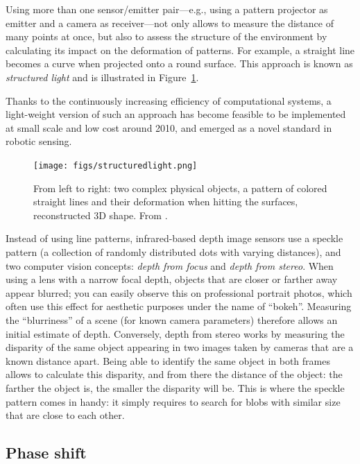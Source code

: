 Using more than one  sensor/emitter pair---e.g., using a pattern projector as emitter and a camera as receiver---not only allows to measure the distance of many points at once, but also to assess the structure of the environment by calculating its impact on the deformation of patterns. For example, a straight line becomes a curve when projected onto a round surface. This approach is known as \textsl{structured light} and is illustrated in Figure~\ref{fig:struclight}.

Thanks to the continuously increasing efficiency of computational systems, a light-weight version of such an approach has become feasible to be implemented at small scale and low cost around 2010, and emerged as a novel standard in robotic sensing.

\begin{figure}
	\centering
		\texttt{[image: figs/structuredlight.png]}
	\caption{From left to right: two complex physical objects, a pattern of colored straight lines and their deformation when hitting the surfaces, reconstructed 3D shape. From \protect\cite{zhang2002rapid}.}
	\label{fig:struclight}
\end{figure}

Instead of using line patterns, infrared-based depth image sensors use a speckle pattern (a collection of randomly distributed dots with varying distances), and two computer vision concepts: \textsl{depth from focus} and \textsl{depth from stereo}. When using a lens with a narrow focal depth, objects that are closer or farther away appear blurred; you can easily observe this on professional portrait photos, which often use this effect for aesthetic purposes under the name of ``bokeh''.
Measuring the ``blurriness'' of a scene (for known camera parameters) therefore allows an initial estimate of depth.
Conversely, depth from stereo works by measuring the disparity of the same object appearing in two images taken by cameras that are a known distance apart. Being able to identify the same object in both frames allows to calculate this disparity, and from there the distance of the object: the farther the object is, the smaller the disparity will be.
This is where the speckle pattern comes in handy: it simply requires to search for blobs with similar size that are close to each other.

\subsection{Phase shift}\label{sec:phaseshiftsensors}

